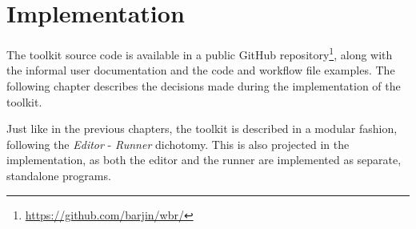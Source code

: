 \chapter{Implementation}

The toolkit source code is available in a public GitHub repository\footnote{\href{https://github.com/barjin/wbr/}{https://github.com/barjin/wbr/}},
along with the informal user documentation and the code and workflow file examples.
The following chapter describes the decisions made during the implementation of the toolkit.

Just like in the previous chapters, the toolkit is described in a modular fashion, following the \textit{Editor} - \textit{Runner} dichotomy.
This is also projected in the implementation, as both the editor and the runner are implemented as separate, standalone programs.

